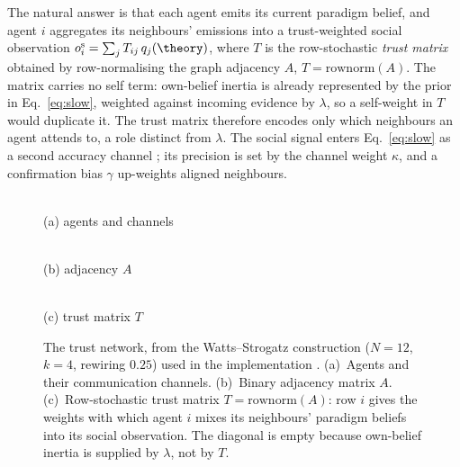 The natural answer is that each agent emits its current paradigm
belief, and agent $i$ aggregates its neighbours' emissions into a
trust-weighted social observation
$o^{\mathrm s}_i = \sum_j T_{ij}\, q_j(\theory)$, where $T$ is the
row-stochastic \emph{trust matrix} obtained by row-normalising the
graph adjacency $A$,
$T = \mathrm{rownorm}(A)$. The matrix carries no self term: own-belief
inertia is already represented by the prior in
Eq.~\eqref{eq:slow}, weighted against incoming evidence by
$\lambda$, so a self-weight in $T$ would duplicate it. The trust
matrix therefore encodes only which neighbours an agent attends to,
a role distinct from $\lambda$. The social signal enters
Eq.~\eqref{eq:slow} as a second accuracy channel
\citep{albarracin2022EpistemicCommunities,veissiere2020TTOM}; its
precision is set by the channel weight $\kappa$, and a confirmation
bias $\gamma$ up-weights aligned neighbours.

\begin{figure}[t]
\centering
\begin{minipage}[b]{0.35\textwidth}\centering
\begin{tikzpicture}[scale=0.92]

\end{tikzpicture}\\[2pt]
{\footnotesize (a) agents and channels}
\end{minipage}\hfill
\begin{minipage}[b]{0.31\textwidth}\centering
{}\\[2pt]
{\footnotesize (b) adjacency $A$}
\end{minipage}\hfill
\begin{minipage}[b]{0.31\textwidth}\centering
{}\\[2pt]
{\footnotesize (c) trust matrix $T$}
\end{minipage}
\caption{The trust network, from the Watts--Strogatz construction
($N{=}12$, $k{=}4$, rewiring $0.25$) used in the implementation
\citep{wattsStrogatz1998SmallWorld}.
(a)~Agents and their communication channels. (b)~Binary adjacency
matrix $A$. (c)~Row-stochastic trust matrix
$T = \mathrm{rownorm}(A)$: row $i$ gives the weights with which
agent $i$ mixes its neighbours' paradigm beliefs into its social
observation. The diagonal is empty because own-belief inertia is
supplied by $\lambda$, not by $T$.}
\label{fig:trust}
\end{figure}

